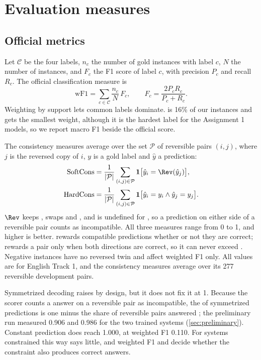 \section{Evaluation measures}
\label{sec:evaluation}

\subsection{Official metrics}

Let $\mathcal{C}$ be the four labels, $n_c$ the number of gold instances with label $c$, $N$ the number of instances, and $F_c$ the F1 score of label $c$, with precision $P_c$ and recall $R_c$. The official classification measure is
\begin{equation}
\mathrm{wF1} = \sum_{c \in \mathcal{C}} \frac{n_c}{N}\, F_c, \qquad F_c = \frac{2 P_c R_c}{P_c + R_c}.
\end{equation}
Weighting by support lets common labels dominate. \NO{} is 16\% of our instances and gets the smallest weight, although it is the hardest label for the Assignment 1 models, so we report macro F1 beside the official score.

The consistency measures average over the set $\mathcal{P}$ of reversible pairs $(i, j)$, where $j$ is the reversed copy of $i$, $y$ is a gold label and $\hat{y}$ a prediction:
\begin{align*}
\mathrm{SoftCons} &= \frac{1}{|\mathcal{P}|} \sum_{(i,j) \in \mathcal{P}} \mathbf{1}\big[\hat{y}_i = \Rev(\hat{y}_j)\big], \\
\mathrm{HardCons} &= \frac{1}{|\mathcal{P}|} \sum_{(i,j) \in \mathcal{P}} \mathbf{1}\big[\hat{y}_i = y_i \wedge \hat{y}_j = y_j\big].
\end{align*}
$\Rev$ keeps \EQ{}, swaps \FW{} and \BW{}, and is undefined for \NO{}, so a \NO{} prediction on either side of a reversible pair counts as incompatible. All three measures range from 0 to 1, and higher is better. \SoftCons{} rewards compatible predictions whether or not they are correct; \HardCons{} rewards a pair only when both directions are correct, so it can never exceed \SoftCons{}. Negative instances have no reversed twin and affect weighted F1 only. All values are for English Track 1, and the consistency measures average over its 277 reversible development pairs.

Symmetrized decoding raises \SoftCons{} by design, but it does not fix it at 1. Because the scorer counts a \NO{} answer on a reversible pair as incompatible, the \SoftCons{} of symmetrized predictions is one minus the share of reversible pairs answered \NO{}; the preliminary run measured 0.906 and 0.986 for the two trained systems (\cref{sec:preliminary}). Constant \EQ{} prediction does reach 1.000, at weighted F1 0.110. For systems constrained this way \SoftCons{} says little, and weighted F1 and \HardCons{} decide whether the constraint also produces correct answers.

